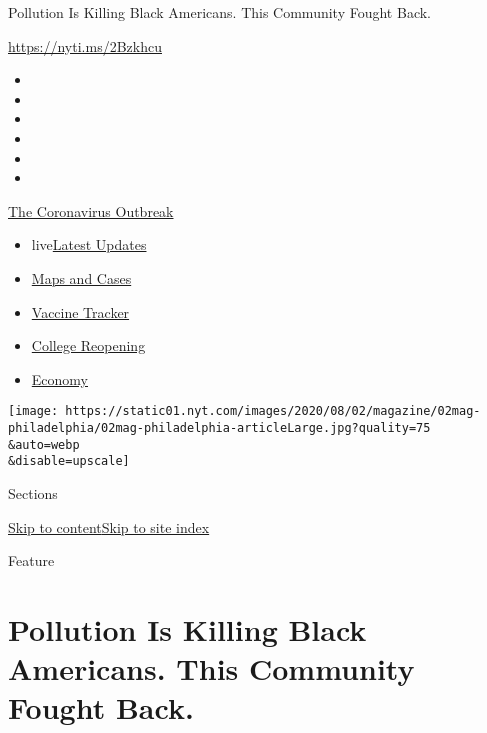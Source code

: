 Pollution Is Killing Black Americans. This Community Fought Back.

\url{https://nyti.ms/2Bzkhcu}

\begin{itemize}
\item
\item
\item
\item
\item
\item
\end{itemize}

\href{https://www.nytimes.com/news-event/coronavirus?action=click\&pgtype=Article\&state=default\&region=TOP_BANNER\&context=storylines_menu}{The
Coronavirus Outbreak}

\begin{itemize}
\tightlist
\item
  live\href{https://www.nytimes.com/2020/08/04/world/coronavirus-cases.html?action=click\&pgtype=Article\&state=default\&region=TOP_BANNER\&context=storylines_menu}{Latest
  Updates}
\item
  \href{https://www.nytimes.com/interactive/2020/us/coronavirus-us-cases.html?action=click\&pgtype=Article\&state=default\&region=TOP_BANNER\&context=storylines_menu}{Maps
  and Cases}
\item
  \href{https://www.nytimes.com/interactive/2020/science/coronavirus-vaccine-tracker.html?action=click\&pgtype=Article\&state=default\&region=TOP_BANNER\&context=storylines_menu}{Vaccine
  Tracker}
\item
  \href{https://www.nytimes.com/2020/08/02/us/covid-college-reopening.html?action=click\&pgtype=Article\&state=default\&region=TOP_BANNER\&context=storylines_menu}{College
  Reopening}
\item
  \href{https://www.nytimes.com/live/2020/08/04/business/stock-market-today-coronavirus?action=click\&pgtype=Article\&state=default\&region=TOP_BANNER\&context=storylines_menu}{Economy}
\end{itemize}

\texttt{[image: https://static01.nyt.com/images/2020/08/02/magazine/02mag-philadelphia/02mag-philadelphia-articleLarge.jpg?quality=75\\\&auto=webp\\\&disable=upscale]}

Sections

\protect\hyperlink{site-content}{Skip to
content}\protect\hyperlink{site-index}{Skip to site index}

Feature

\hypertarget{pollution-is-killing-black-americans-this-community-fought-back}{%
\section{Pollution Is Killing Black Americans. This Community Fought
Back.}\label{pollution-is-killing-black-americans-this-community-fought-back}}

